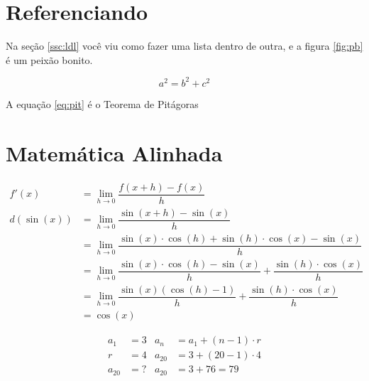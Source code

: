 \documentclass[12pt,a4paper]{article}
\begin{document}
\section{Referenciando}
Na seção \ref{ssc:ldl} você viu como fazer uma lista dentro de outra, e a figura \ref{fig:pb} é um peixão bonito.

\begin{equation}
a^2 = b^2 + c^2
\label{eq:pit}
\end{equation}

A equação \eqref{eq:pit} é o Teorema de Pitágoras

\section{Matemática Alinhada}
\begin{align*}
f'(x) &= \lim_{h \to 0} \dfrac{f(x+h) - f(x)}{h}\\
d(\sin(x)) &= \lim_{h \to 0} \dfrac{\sin(x+h) - \sin(x)}{h}\\
 &= \lim_{h \to 0} \dfrac{\sin(x)\cdot \cos(h) + \sin(h)\cdot\cos(x) - \sin(x)}{h}\\
 &= \lim_{h \to 0} \dfrac{\sin(x)\cdot \cos(h)- \sin(x)}{h} + \dfrac{\sin(h)\cdot\cos(x)}{h}\\
 &= \lim_{h \to 0} \dfrac{\sin(x)(\cos(h)- 1)}{h} + \dfrac{\sin(h)\cdot\cos(x)}{h}\\
 &= \cos(x)
\end{align*}

\begin{align*}
a_1 &= 3 & a_n &= a_1 + (n-1)\cdot r\\
r &= 4 & a_{20} &= 3 + (20-1)\cdot 4\\
a_{20} &= ? & a_{20} &= 3 + 76 = 79\\
\end{align*}
\newpage
\end{document}
